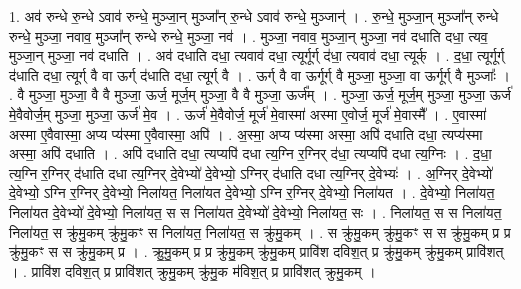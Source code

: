 \documentclass[17pt]{extarticle}
\begin{document}
1. अव॑ रुन्धे रु॒न्धे ऽवाव॑ रुन्धे॒ मुञ्जा॒न् मुञ्जा᳚न् रु॒न्धे ऽवाव॑ रुन्धे॒ मुञ्जान्॑ । . रु॒न्धे॒ मुञ्जा॒न् मुञ्जा᳚न् रुन्धे रुन्धे॒ मुञ्जा॒ नवाव॒ मुञ्जा᳚न् रुन्धे रुन्धे॒ मुञ्जा॒ नव॑ । . मुञ्जा॒ नवाव॒ मुञ्जा॒न् मुञ्जा॒ नव॑ दधाति दधा॒ त्यव॒ मुञ्जा॒न् मुञ्जा॒ नव॑ दधाति । . अव॑ दधाति दधा॒ त्यवाव॑ दधा॒ त्यूर्गूर्ग् द॑धा॒ त्यवाव॑ दधा॒ त्यूर्क् । . द॒धा॒ त्यूर्गूर्ग् द॑धाति दधा॒ त्यूर्ग् वै वा ऊर्ग् द॑धाति दधा॒ त्यूर्ग् वै । . ऊर्ग् वै वा ऊर्गूर्ग् वै मुञ्जा॒ मुञ्जा॒ वा ऊर्गूर्ग् वै मुञ्जाः᳚ । . वै मुञ्जा॒ मुञ्जा॒ वै वै मुञ्जा॒ ऊर्ज॒ मूर्ज॒म् मुञ्जा॒ वै वै मुञ्जा॒ ऊर्ज᳚म् । . मुञ्जा॒ ऊर्ज॒ मूर्ज॒म् मुञ्जा॒ मुञ्जा॒ ऊर्ज॑ मे॒वैवोर्ज॒म् मुञ्जा॒ मुञ्जा॒ ऊर्ज॑ मे॒व । . ऊर्ज॑ मे॒वैवोर्ज॒ मूर्ज॑ मे॒वास्मा॑ अस्मा ए॒वोर्ज॒ मूर्ज॑ मे॒वास्मै᳚ । . ए॒वास्मा॑ अस्मा ए॒वैवास्मा॒ अप्य प्य॑स्मा ए॒वैवास्मा॒ अपि॑ । . अ॒स्मा॒ अप्य प्य॑स्मा अस्मा॒ अपि॑ दधाति दधा॒ त्यप्य॑स्मा अस्मा॒ अपि॑ दधाति । . अपि॑ दधाति दधा॒ त्यप्यपि॑ दधा त्य॒ग्नि र॒ग्निर् द॑धा॒ त्यप्यपि॑ दधा त्य॒ग्निः । . द॒धा॒ त्य॒ग्नि र॒ग्निर् द॑धाति दधा त्य॒ग्निर् दे॒वेभ्यो॑ दे॒वेभ्यो॒ ऽग्निर् द॑धाति दधा त्य॒ग्निर् दे॒वेभ्यः॑ । . अ॒ग्निर् दे॒वेभ्यो॑ दे॒वेभ्यो॒ ऽग्नि र॒ग्निर् दे॒वेभ्यो॒ निला॑यत॒ निला॑यत दे॒वेभ्यो॒ ऽग्नि र॒ग्निर् दे॒वेभ्यो॒ निला॑यत । . दे॒वेभ्यो॒ निला॑यत॒ निला॑यत दे॒वेभ्यो॑ दे॒वेभ्यो॒ निला॑यत॒ स स निला॑यत दे॒वेभ्यो॑ दे॒वेभ्यो॒ निला॑यत॒ सः । . निला॑यत॒ स स निला॑यत॒ निला॑यत॒ स क्रु॑मु॒कम् क्रु॑मु॒कꣳ स निला॑यत॒ निला॑यत॒ स क्रु॑मु॒कम् । . स क्रु॑मु॒कम् क्रु॑मु॒कꣳ स स क्रु॑मु॒कम् प्र प्र क्रु॑मु॒कꣳ स स क्रु॑मु॒कम् प्र । . क्रु॒मु॒कम् प्र प्र क्रु॑मु॒कम् क्रु॑मु॒कम् प्रावि॑श दविश॒त् प्र क्रु॑मु॒कम् क्रु॑मु॒कम् प्रावि॑शत् । . प्रावि॑श दविश॒त् प्र प्रावि॑शत् क्रुमु॒कम् क्रु॑मु॒क म॑विश॒त् प्र प्रावि॑शत् क्रुमु॒कम् । \newline
\end{document}
